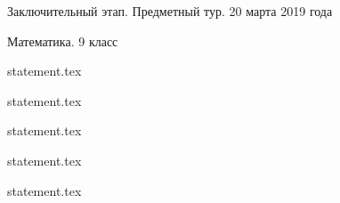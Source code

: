 \documentclass[a4paper,11pt, oneside]{book}
\begin{document}
\vspace{-3mm}
\vspace{-5mm}
\vspace{-5mm}

\normalsize

\begin{center}
    Заключительный этап. Предметный тур. 20 марта 2019 года
    
    Математика. 9 класс
\end{center}

\parindent=0cm

{statement.tex}

{statement.tex}

{statement.tex}

{statement.tex}

\clearpage

{statement.tex}
\end{document}
